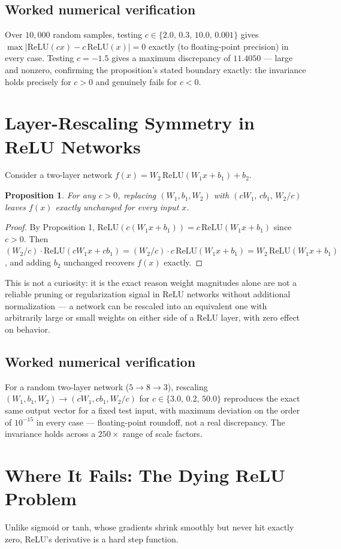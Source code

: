 \documentclass[10pt,journal,compsoc]{IEEEtran}
\newtheorem{proposition}{Proposition}
\begin{document}
\subsection{Worked numerical verification}
Over $10{,}000$ random samples, testing $c\in\{2.0,\,0.3,\,10.0,\,0.001\}$ gives $\max|\mathrm{ReLU}(cx)-c\,\mathrm{ReLU}(x)| = 0$ exactly (to floating-point precision) in every case. Testing $c=-1.5$ gives a maximum discrepancy of $11.4050$ — large and nonzero, confirming the proposition's stated boundary exactly: the invariance holds precisely for $c>0$ and genuinely fails for $c<0$.

\section{Layer-Rescaling Symmetry in ReLU Networks}
Consider a two-layer network $f(x) = W_2\,\mathrm{ReLU}(W_1x+b_1)+b_2$.

\begin{proposition}
For any $c>0$, replacing $(W_1,b_1,W_2)$ with $(cW_1,\,cb_1,\,W_2/c)$ leaves $f(x)$ exactly unchanged for every input $x$.
\end{proposition}
\begin{proof}
By Proposition 1, $\mathrm{ReLU}(c(W_1x+b_1)) = c\,\mathrm{ReLU}(W_1x+b_1)$ since $c>0$. Then $(W_2/c)\cdot\mathrm{ReLU}(cW_1x+cb_1) = (W_2/c)\cdot c\,\mathrm{ReLU}(W_1x+b_1) = W_2\,\mathrm{ReLU}(W_1x+b_1)$, and adding $b_2$ unchanged recovers $f(x)$ exactly.
\end{proof}
This is not a curiosity: it is the exact reason weight magnitudes alone are not a reliable pruning or regularization signal in ReLU networks without additional normalization — a network can be rescaled into an equivalent one with arbitrarily large or small weights on either side of a ReLU layer, with zero effect on behavior.

\subsection{Worked numerical verification}
For a random two-layer network ($5\to8\to3$), rescaling $(W_1,b_1,W_2)\to(cW_1,cb_1,W_2/c)$ for $c\in\{3.0,\,0.2,\,50.0\}$ reproduces the exact same output vector for a fixed test input, with maximum deviation on the order of $10^{-15}$ in every case — floating-point roundoff, not a real discrepancy. The invariance holds across a $250\times$ range of scale factors.

\section{Where It Fails: The Dying ReLU Problem}
Unlike sigmoid or tanh, whose gradients shrink smoothly but never hit exactly zero, ReLU's derivative is a hard step function.
\end{document}
